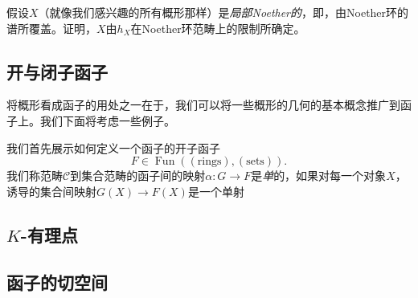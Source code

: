 \begin{exe}
假设$X$（就像我们感兴趣的所有概形那样）是\textit{局部Noether的}，即，由Noether环的谱所覆盖。证明，$X$由$h_X$在Noether环范畴上的限制所确定。
\end{exe}

\subsection{开与闭子函子} \label{s:6.1.1}

将概形看成函子的用处之一在于，我们可以将一些概形的几何的基本概念推广到函子上。我们下面将考虑一些例子。

我们首先展示如何定义一个函子的开子函子
\[
	F\in \operatorname{Fun}((\text{rings}),(\text{sets})).
\]
我们称范畴$\mathscr C$到集合范畴的函子间的映射$\alpha:G\to F$是\textit{单}的，如果对每一个对象$X$，诱导的集合间映射$G(X)\to F(X)$是一个单射 \nottran


\subsection{$K$-有理点} \label{s:6.1.2}
\subsection{函子的切空间} \label{s:6.1.3}